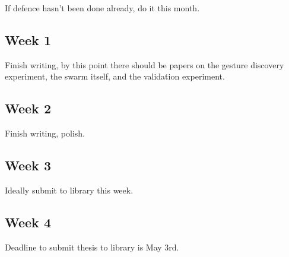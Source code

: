 If defence hasn't been done already, do it this month. 

\subsection{Week 1}

Finish writing, by this point there should be papers on the gesture discovery experiment, the swarm itself, and the validation experiment. 

\subsection{Week 2}

Finish writing, polish. 

\subsection{Week 3}

Ideally submit to library this week.

\subsection{Week 4}

Deadline to submit thesis to library is May 3rd.